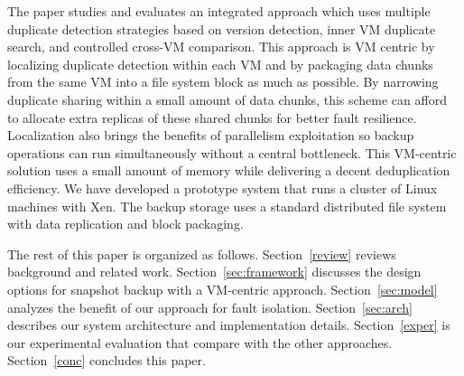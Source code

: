 The paper studies and evaluates  an integrated approach which uses  multiple duplicate detection strategies
based on  version  detection, inner VM duplicate search,
and controlled cross-VM comparison. 
This approach is VM centric by localizing duplicate detection within each VM  
and by packaging data chunks from the same VM into a file system block as much as possible.
By narrowing duplicate sharing within a small amount of data chunks,
this scheme can afford to allocate extra replicas of these shared chunks for better
fault resilience.
Localization also brings the benefits of parallelism exploitation so
backup operations can run simultaneously without a central  bottleneck.
This  VM-centric solution uses  a small amount of  memory while delivering a decent deduplication efficiency. 
We have developed a prototype system that runs a cluster of Linux machines with Xen.
The backup storage uses a standard distributed file system with data replication and block packaging.



The rest of this paper is organized as follows.
Section~\ref{review} reviews background and related work.
Section~\ref{sec:framework}  discusses the  design options for snapshot backup with a VM-centric approach. 
Section~\ref{sec:model}  analyzes the benefit of our approach for fault isolation. 
Section~\ref{sec:arch}  describes our system architecture and implementation details.
Section~\ref{exper} is our experimental evaluation that compare with the other approaches.
Section~\ref{conc}  concludes this paper.


